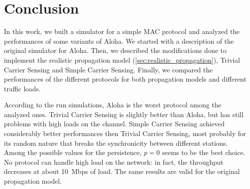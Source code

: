 \section{Conclusion}
\label{sec:conclusion}

In this work, we built a simulator for a simple \ac{MAC} protocol and analyzed the performances of some variants of Aloha.
We started with a description of the original simulator for Aloha.
Then, we described the modifications done to implement the realistic propagation model (\cref{sec:realistic_propagation}), Trivial Carrier Sensing and Simple Carrier Sensing.
Finally, we compared the performances of the different protocols for both propagation models and different traffic loads.

According to the run simulations, Aloha is the worst protocol among the analyzed ones.
Trivial Carrier Sensing is slightly better than Aloha, but has still problems with high loads on the channel.
Simple Carrier Sensing achieved considerably better performances then Trivial Carrier Sensing, most probably for its random nature that breaks the synchronicity between different stations.
Among the possible values for the persistence, $p = \num{0}$ seems to be the best choice.
No protocol can handle high load on the network: in fact, the throughput decreases at about \SI{10}{Mbps} of load.
The same results are valid for the original propagation model.
